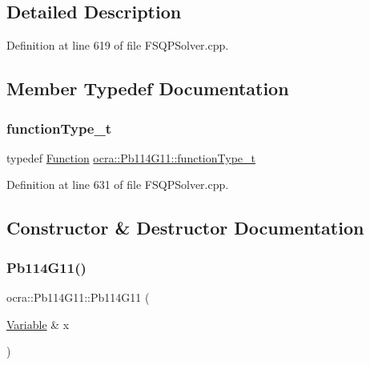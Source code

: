 \subsection{Detailed Description}


Definition at line 619 of file F\+S\+Q\+P\+Solver.\+cpp.



\subsection{Member Typedef Documentation}
\hypertarget{classocra_1_1Pb114G11_a6a78a86715026be7613e399955407e93}{}\label{classocra_1_1Pb114G11_a6a78a86715026be7613e399955407e93} 
\subsubsection{\texorpdfstring{function\+Type\+\_\+t}{functionType\_t}}
{\footnotesize\ttfamily typedef \hyperlink{classocra_1_1Function}{Function} \hyperlink{classocra_1_1Pb114G11_a6a78a86715026be7613e399955407e93}{ocra\+::\+Pb114\+G11\+::function\+Type\+\_\+t}}



Definition at line 631 of file F\+S\+Q\+P\+Solver.\+cpp.



\subsection{Constructor \& Destructor Documentation}
\hypertarget{classocra_1_1Pb114G11_a530be5f34e9ae31c8db6b1a62658dbe6}{}\label{classocra_1_1Pb114G11_a530be5f34e9ae31c8db6b1a62658dbe6} 
\subsubsection{\texorpdfstring{Pb114\+G11()}{Pb114G11()}}
{\footnotesize\ttfamily ocra\+::\+Pb114\+G11\+::\+Pb114\+G11 (\begin{DoxyParamCaption}\item[{\hyperlink{classocra_1_1Variable}{Variable} \&}]{x }\end{DoxyParamCaption})\hspace{0.3cm}{\ttfamily [inline]}}



